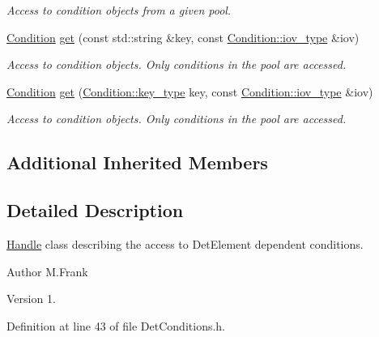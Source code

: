 \begin{DoxyCompactItemize}
\begin{DoxyCompactList}\small\item\em Access to condition objects from a given pool. \end{DoxyCompactList}\item 
\hyperlink{class_d_d4hep_1_1_conditions_1_1_condition}{Condition} \hyperlink{class_d_d4hep_1_1_conditions_1_1_det_conditions_a0bb1e77e051b8fc167a54dadbed90ca1}{get} (const std\+::string \&key, const \hyperlink{class_d_d4hep_1_1_conditions_1_1_condition_ad84300e226b2085ec5e9db7f47be5539}{Condition\+::iov\+\_\+type} \&iov)
\begin{DoxyCompactList}\small\item\em Access to condition objects. Only conditions in the pool are accessed. \end{DoxyCompactList}\item 
\hyperlink{class_d_d4hep_1_1_conditions_1_1_condition}{Condition} \hyperlink{class_d_d4hep_1_1_conditions_1_1_det_conditions_a27faa309035740b80ff2053fff6f30ba}{get} (\hyperlink{class_d_d4hep_1_1_conditions_1_1_condition_a7528efa762e8cc072ef80ea67c3531f9}{Condition\+::key\+\_\+type} key, const \hyperlink{class_d_d4hep_1_1_conditions_1_1_condition_ad84300e226b2085ec5e9db7f47be5539}{Condition\+::iov\+\_\+type} \&iov)
\begin{DoxyCompactList}\small\item\em Access to condition objects. Only conditions in the pool are accessed. \end{DoxyCompactList}\end{DoxyCompactItemize}
\subsection*{Additional Inherited Members}


\subsection{Detailed Description}
\hyperlink{class_d_d4hep_1_1_handle}{Handle} class describing the access to Det\+Element dependent conditions. 

\begin{DoxyAuthor}{Author}
M.\+Frank 
\end{DoxyAuthor}
\begin{DoxyVersion}{Version}
1. 
\end{DoxyVersion}


Definition at line 43 of file Det\+Conditions.\+h.



